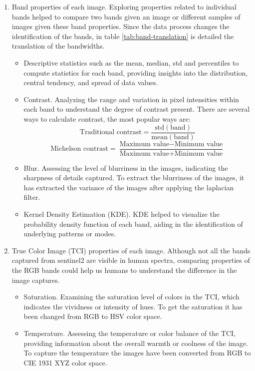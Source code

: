 \begin{enumerate}
	\item Band properties of each image. Exploring properties related to individual bands helped to compare two bands given an image or different samples of images given these band properties. Since the data process changes the identification of the bands, in table \ref{tab:band-translation} is detailed the translation of the bandwidths.
	\begin{itemize}
		\item Descriptive statistics such as the mean, median, std and percentiles to compute  statistics for each band, providing insights into the distribution, central tendency, and spread of data values.
		\item Contrast. Analyzing the range and variation in pixel intensities within each band to understand the degree of contrast present. There are several ways to calculate contrast, the most popular ways are:
		\[\text{Traditional contrast} = \frac{\text{std}(\text{band})}{\text{mean}(\text{band})}\]
		\[\text{Michelson contrast} = \frac{\text{Maximum value} - \text{Minimum value}}{\text{Maximum value} + \text{Minimum value}}\]
		\item Blur. Assessing the level of blurriness in the images, indicating the sharpness of details captured. To extract the blurriness of the images, it has extracted the variance of the images after applying the laplacian filter.
		\item Kernel Density Estimation (KDE). KDE helped to visualize the probability density function of each band, aiding in the identification of underlying patterns or modes.
	\end{itemize}
	\item True Color Image (TCI) properties of each image. Although not all the bands captured from sentinel2 are visible in human spectra, comparing properties of the RGB bands could help us humans to understand the difference in the image captures.
	\begin{itemize}
		\item Saturation. Examining the saturation level of colors in the TCI, which indicates the vividness or intensity of hues. To get the saturation it has been changed from RGB to HSV color space.
		\item Temperature. Assessing the temperature or color balance of the TCI, providing information about the overall warmth or coolness of the image. To capture the temperature the images have been converted from RGB to CIE 1931 XYZ color space.

\end{itemize}
\end{enumerate}
